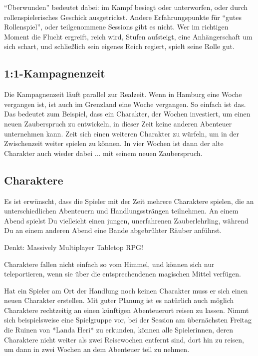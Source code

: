 \documentclass[11pt]{wbzine}
\begin{document}
\begin{multicols}{2}
    ``Überwunden'' bedeutet dabei: im Kampf besiegt oder
    unterworfen, oder durch rollenspielerisches Geschick
    ausgetrickst. Andere Erfahrungspunkte für ``gutes Rollenspiel'',
    oder teilgenommene Sessions gibt es nicht. Wer im richtigen
    Moment die Flucht ergreift, reich wird, Stufen aufsteigt, eine
    Anhängerschaft um sich schart, und schließlich sein eigenes
    Reich regiert, spielt seine Rolle gut.
    
    \subsection{1:1-Kampagnenzeit}

    Die Kampagnenzeit läuft parallel zur Realzeit. Wenn in Hamburg
    eine Woche vergangen ist, ist auch im Grenzland eine Woche
    vergangen. So einfach ist das. Das bedeutet zum Beispiel, dass
    ein Charakter, der Wochen investiert, um einen neuen
    Zauberspruch zu entwickeln, in dieser Zeit keine anderen
    Abenteuer unternehmen kann. Zeit sich einen weiteren Charakter
    zu würfeln, um in der Zwischenzeit weiter spielen zu können. In
    vier Wochen ist dann der alte Charakter auch wieder dabei ...
    mit seinem neuen Zauberspruch.

    \subsection{Charaktere}

    Es ist erwünscht, dass die Spieler mit der Zeit mehrere
    Charaktere spielen, die an unterschiedlichen Abenteuern und
    Handlungssträngen teilnehmen. An einem Abend spielst Du
    vielleicht einen jungen, unerfahrenen Zauberlehrling, während Du
    an einem anderen Abend eine Bande abgebrühter Räuber anführst.

    \begin{tcolorbox} 
         Denkt: Massively Multiplayer Tabletop RPG!  
    \end{tcolorbox}

    Charaktere fallen nicht einfach so vom Himmel, und können sich
    nur teleportieren, wenn sie über die entsprechendenen magischen
    Mittel verfügen.

    Hat ein Spieler am Ort der Handlung noch keinen Charakter muss
    er sich einen neuen Charakter erstellen. Mit guter Planung ist
    es natürlich auch möglich Charaktere rechtzeitig an einen
    künftigen Abenteuerort reisen zu lassen. Nimmt sich
    beispielsweise eine Spielgruppe vor, bei der Session am
    übernächsten Freitag die Ruinen von *Landa Heri* zu erkunden,
    können alle Spielerinnen, deren Charaktere nicht weiter als zwei
    Reisewochen entfernt sind, dort hin zu reisen, um dann in zwei
    Wochen an dem Abenteuer teil zu nehmen.


\end{multicols}
\end{document}
